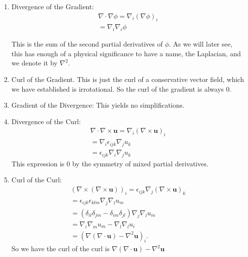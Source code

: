 \documentclass[]{article}
\begin{document}
\begin{enumerate}

		\item Divergence of the Gradient: 
				\begin{align*}
						\nabla \cdot \nabla \phi = \nabla_i (\nabla \phi)_i \\
						= \nabla_i \nabla_i \phi
				\end{align*}

				This is the sum of the second partial derivatives of $\phi$. As we will later see, this has enough of a physical significance to have a name, the Laplacian, and we denote it by $\nabla^2$.

		\item Curl of the Gradient. This is just the curl of a conservative vector field, which we have established is irrotational. So the curl of the gradient is always $0$.

		\item Gradient of the Divergence: This yields no simplifications.

		\item Divergence of the Curl:
				\begin{align*}
						\nabla \cdot \nabla \times \mathbf{u} = \nabla_i (\nabla \times \mathbf{u})_i \\
						= \nabla_i \epsilon_{ijk} \nabla_j u_k \\
						= \epsilon_{ijk} \nabla_i \nabla_j u_k
				\end{align*}
				This expression is $0$ by the symmetry of mixed partial derivatives.

		\item Curl of the Curl:
				\begin{align*}
						(\nabla \times (\nabla \times \mathbf{u}))_i = \epsilon_{ijk} \nabla_j (\nabla \times \mathbf{u})_k \\
						= \epsilon_{ijk}\epsilon_{klm} \nabla_j \nabla_l u_m \\
						= (\delta_{il}\delta_{jm} - \delta_{im}\delta_{jl}) \nabla_j \nabla_l u_m \\
						= \nabla_i \nabla_m u_m - \nabla_l \nabla_l u_i \\
						= (\nabla(\nabla \cdot \mathbf{u}) - \nabla^2 \mathbf{u})_i.
				\end{align*}
				So we have the curl of the curl is $\nabla(\nabla \cdot \mathbf{u}) - \nabla^2 \mathbf{u}$
		
\end{enumerate}
\end{document}
